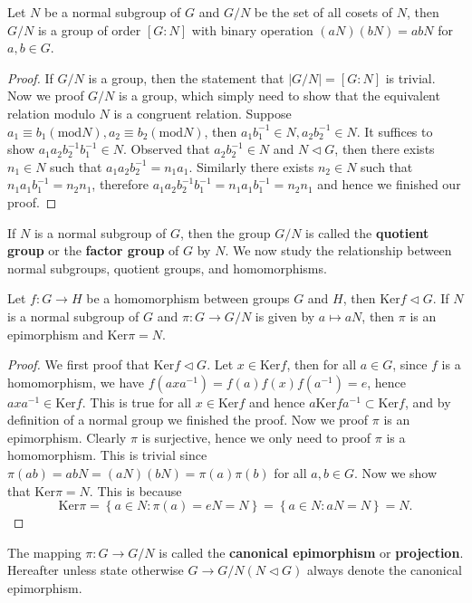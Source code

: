 \begin{theorem}
Let $N$ be a normal subgroup of $G$ and $G/N$ be the set of all cosets of $N$, then $G/N$ is a group of order $[G:N]$ with binary operation $(aN)(bN)=abN$ for $a,b\in G$.
\end{theorem}
\begin{proof}
If $G/N$ is a group, then the statement that $|G/N|=[G:N]$ is trivial. Now we proof $G/N$ is a group, which simply need to show that the equivalent relation modulo $N$ is a congruent relation. Suppose $a_1\equiv b_1\left( \mathrm{mod}N \right) ,a_2\equiv b_2\left( \mathrm{mod}N \right) $, then $a_1b_{1}^{-1}\in N,a_2b_{2}^{-1}\in N$. It suffices to show $a_1a_2b_{2}^{-1}b_{1}^{-1}\in N$. Observed that $a_2b_{2}^{-1}\in N$ and $N\lhd G$, then there exists $n_1\in N$ such that $a_1a_2b_{2}^{-1}=n_1a_1$. Similarly there exists $n_2\in N$ such that $n_1a_1b_{1}^{-1}=n_2n_1$, therefore $a_1a_2b_{2}^{-1}b_{1}^{-1}=n_1a_1b_{1}^{-1}=n_2n_1$ and hence we finished our proof.
\end{proof}
If $N$ is a normal subgroup of $G$, then the group $G/N$ is called the \textbf{quotient group} or the \textbf{factor group} of $G$ by $N$. We now study the relationship between  normal subgroups, quotient groups, and homomorphisms.
\begin{theorem}
Let $f:G\to H$ be a homomorphism between groups $G$ and $H$, then $\mathrm{Ker}f\lhd G$. If $N$ is a normal subgroup of $G$ and $\pi:G\to G/N$ is given by $a\mapsto aN$, then $\pi$ is an epimorphism and $\mathrm{Ker}\pi=N$.
\end{theorem}
\begin{proof}
We first proof that $\mathrm{Ker}f\lhd G$. Let $x\in\mathrm{Ker}f$, then for all $a\in G$, since $f$ is a homomorphism, we have $f(axa^{-1})=f(a)f(x)f(a^{-1})=e$, hence $axa^{-1}\in\mathrm{Ker}f$. This is true for all $x\in\mathrm{Ker}f$ and hence $a\mathrm{Ker}fa^{-1}\subset\mathrm{Ker}f$, and by definition of a normal group we finished the proof. Now we proof $\pi$ is an epimorphism. Clearly $\pi$ is surjective, hence we only need to proof $\pi$ is a homomorphism. This is trivial since $\pi(ab)=abN=(aN)(bN)=\pi(a)\pi(b)$ for all $a,b\in G$. Now we show that $\mathrm{Ker}\pi=N$. This is because 
$$
\mathrm{Ker}\pi =\left\{ a\in N:\pi \left( a \right) =eN=N \right\} =\left\{ a\in N:aN=N \right\} =N.
$$
\end{proof}
The mapping $\pi:G\to G/N$ is called the \textbf{canonical epimorphism} or \textbf{projection}. Hereafter unless state otherwise $G\to G/N(N\lhd G)$ always denote the canonical epimorphism.
